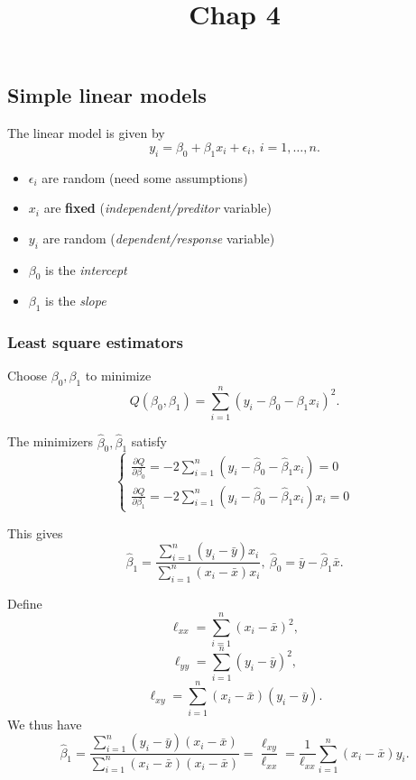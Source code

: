 \documentclass[]{article}
\title{Chap 4}
\author{}
\date{}
\providecommand{\tightlist}{%
  \setlength{\itemsep}{0pt}\setlength{\parskip}{0pt}}
\begin{document}
\maketitle

\hypertarget{simple-linear-models}{%
\subsection{Simple linear models}\label{simple-linear-models}}

The linear model is given by
\[y_i=\beta_0+\beta_1x_i+\epsilon_i,\ i=1,\dots,n.\]

\begin{itemize}
\tightlist
\item
  \(\epsilon_i\) are random (need some assumptions)
\item
  \(x_i\) are \textbf{fixed} (\emph{independent/preditor} variable)
\item
  \(y_i\) are random (\emph{dependent/response} variable)
\item
  \(\beta_0\) is the \emph{intercept}
\item
  \(\beta_1\) is the \emph{slope}
\end{itemize}

\hypertarget{least-square-estimators}{%
\subsubsection{Least square estimators}\label{least-square-estimators}}

Choose \(\beta_0,\beta_1\) to minimize
\[Q(\beta_0,\beta_1) = \sum_{i=1}^n(y_i-\beta_0-\beta_1x_i)^2.\]

The minimizers \(\hat\beta_0,\hat\beta_1\) satisfy \[
\begin{cases}
\frac{\partial Q}{\partial \beta_0} = -2\sum_{i=1}^n(y_i-\hat\beta_0-\hat\beta_1x_i)=0\\
\frac{\partial Q}{\partial \beta_1} = -2\sum_{i=1}^n(y_i-\hat\beta_0-\hat\beta_1x_i)x_i=0
\end{cases}
\]

This gives
\[\hat\beta_1 = \frac{\sum_{i=1}^n(y_i-\bar y)x_i}{\sum_{i=1}^n(x_i-\bar x)x_i},\ \hat\beta_0=\bar y-\hat\beta_1\bar x.\]

Define \[\ell_{xx} = \sum_{i=1}^n(x_i-\bar x)^2,\]
\[\ell_{yy} = \sum_{i=1}^n(y_i-\bar y)^2,\]
\[\ell_{xy} = \sum_{i=1}^n(x_i-\bar x)(y_i-\bar y).\] We thus have
\[\hat\beta_1 = \frac{\sum_{i=1}^n(y_i-\bar y)(x_i-\bar x)}{\sum_{i=1}^n(x_i-\bar x)(x_i-\bar x)}=\frac{\ell_{xy}}{\ell_{xx}}=\frac{1}{\ell_{xx}}\sum_{i=1}^n(x_i-\bar x)y_i.\]
\end{document}
